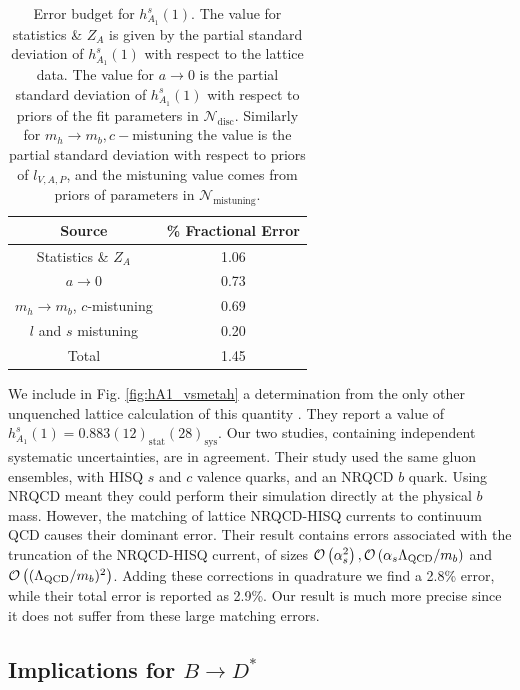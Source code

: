 \begin{table}
  \begin{center}
    \begin{tabular}{c c}
      \hline
      Source & \% Fractional Error \\ [0.5ex]
      \hline
      Statistics \& $Z_A$ & 1.06  \\ [1ex]
      $a\to 0$ & 0.73  \\ [1ex]
      $m_h \to m_b$, $c$-mistuning & 0.69 \\ [1ex]
      $l$ and $s$  mistuning & 0.20  \\ [1ex]
      \hline
      Total & 1.45 \\ [1ex]
      \hline
    \end{tabular}
  \end{center}
  \caption{Error budget for $h^s_{A_1}(1)$. The value for statistics \& $Z_A$ is given by the partial standard deviation of $h_{A_1}^s(1)$ with respect to the lattice data. The value for $a\to 0$ is the partial standard deviation of $h_{A_1}^s(1)$ with respect to priors of the fit parameters in $\mathcal{N}_{\text{disc}}$. Similarly for $m_h\to m_b,c-$mistuning the value is the partial standard deviation with respect to priors of $l_{V,A,P}$, and the mistuning value comes from priors of parameters in $\mathcal{N}_{\text{mistuning}}$.  \label{tab:errorbudget_BsDsstar}}
\end{table}

We include in Fig. \ref{fig:hA1_vsmetah} a determination from the only other unquenched lattice calculation of this quantity \cite{Harrison:2017fmw}. They report a value of $h_{A_1}^s(1) = 0.883(12)_{\text{stat}}(28)_{\text{sys}}$. Our two studies, containing independent systematic uncertainties, are in agreement. Their study used the same gluon ensembles, with HISQ $s$ and $c$ valence quarks, and an NRQCD $b$ quark. Using NRQCD meant they could perform their simulation directly at the physical $b$ mass. However, the matching of lattice NRQCD-HISQ currents to continuum QCD causes their dominant error. Their result contains errors associated with the truncation of the NRQCD-HISQ current, of sizes $\mathcal{O}\left( \alpha_s^2 \right),\mathcal{O}\left( \alpha_s \Lambda_{\text{QCD}}/m_b \right)$ and $\mathcal{O}\left( (\Lambda_{\text{QCD}}/m_b)^2 \right)$. Adding these corrections in quadrature we find a 2.8\% error, while their total error is reported as 2.9\%. Our result is much more precise since it does not suffer from these large matching errors.

\subsection{Implications for $B\to D^*$}

